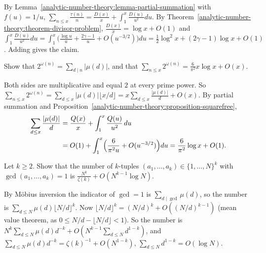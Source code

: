 \begin{solution}
By Lemma~\ref{analytic-number-theory:lemma-partial-summation} with $f(u) = 1/u$, $\sum_{n \leq x}\frac{\tau(n)}{n} = \frac{D(x)}{x} + \int_1^x\frac{D(u)}{u^2}du$. By
Theorem~\ref{analytic-number-theory:theorem-divisor-problem}, $\frac{D(x)}{x} = \log x + O(1)$ and
$\int_1^x\frac{D(u)}{u^2}du = \int_1^x\bigl(\frac{\log u}{u} + \frac{2\gamma - 1}{u} + O(u^{-3/2})\bigr)du = \frac12\log^2x + (2\gamma - 1)\log x + O(1)$. Adding gives the claim.
\end{solution}

\begin{exercise}\label{analytic-number-theory:exercise-squarefree-divisors}
Show that $2^{\omega(n)} = \sum_{d \mid n}|\mu(d)|$, and that $\sum_{n \leq x}2^{\omega(n)} = \frac{6}{\pi^2}x\log x + O(x)$.
\end{exercise}

\begin{solution}
Both sides are multiplicative and equal $2$ at every prime power. So $\sum_{n \leq x}2^{\omega(n)} = \sum_{d \leq x}|\mu(d)|\lfloor x/d\rfloor = x\sum_{d \leq x}\frac{|\mu(d)|}{d} + O(x)$. By partial summation and
Proposition~\ref{analytic-number-theory:proposition-squarefree},
\[
\begin{aligned}
\sum_{d \leq x}\frac{|\mu(d)|}{d} &= \frac{Q(x)}{x} + \int_1^x\frac{Q(u)}{u^2}\,du \\
&= O(1) + \int_1^x\Bigl(\frac{6}{\pi^2u} + O(u^{-3/2})\Bigr)du = \frac{6}{\pi^2}\log x + O(1).
\end{aligned}
\]
\end{solution}

\begin{exercise}\label{analytic-number-theory:exercise-coprime-tuples}
Let $k \geq 2$. Show that the number of $k$-tuples $(a_1, \ldots, a_k) \in \{1, \ldots, N\}^k$ with $\gcd(a_1, \ldots, a_k) = 1$ is $\frac{N^k}{\zeta(k)} + O(N^{k-1}\log N)$.
\end{exercise}

\begin{solution}
By Möbius inversion the indicator of $\gcd = 1$ is $\sum_{d \mid \gcd}\mu(d)$, so the number is $\sum_{d \leq N}\mu(d)\lfloor N/d\rfloor^k$. Now $\lfloor N/d\rfloor^k = (N/d)^k + O((N/d)^{k-1})$ (mean value
theorem, as $0 \leq N/d - \lfloor N/d\rfloor < 1$). So the number is $N^k\sum_{d \leq N}\mu(d)d^{-k} + O(N^{k-1}\sum_{d \leq N}d^{1-k})$, and $\sum_{d \leq N}\mu(d)d^{-k} = \zeta(k)^{-1} + O(N^{1-k})$,
$\sum_{d \leq N}d^{1-k} = O(\log N)$.
\end{solution}

